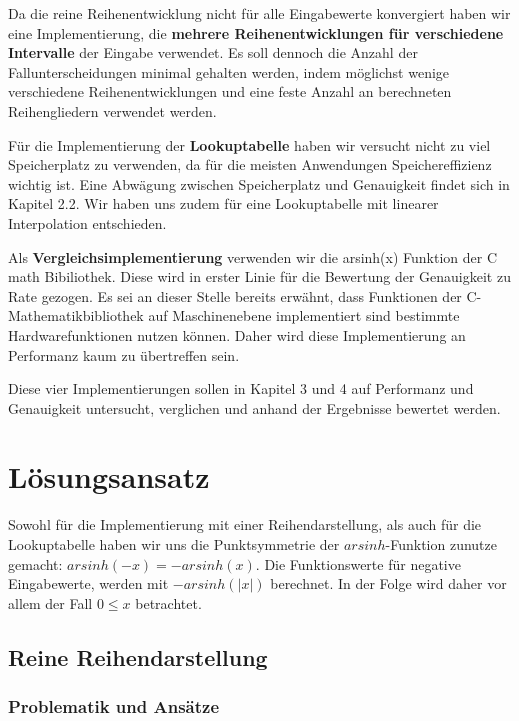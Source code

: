 \documentclass[course=erap] {aspdoc}
\begin{document}
     Da die reine Reihenentwicklung nicht für alle Eingabewerte konvergiert haben wir eine Implementierung, die \textbf{mehrere Reihenentwicklungen für verschiedene Intervalle} der Eingabe verwendet. Es soll dennoch die Anzahl der Fallunterscheidungen minimal gehalten werden, indem  möglichst wenige verschiedene Reihenentwicklungen und eine feste Anzahl an berechneten Reihengliedern verwendet werden.
 
     Für die Implementierung der \textbf{Lookuptabelle} haben wir versucht nicht zu viel Speicherplatz zu verwenden, da für die meisten Anwendungen Speichereffizienz wichtig ist. Eine Abwägung zwischen Speicherplatz und Genauigkeit findet sich in Kapitel 2.2. Wir haben uns zudem für eine Lookuptabelle mit linearer Interpolation entschieden.
 
     Als \textbf{Vergleichsimplementierung} verwenden wir die arsinh(x) Funktion der C math Bibiliothek. Diese wird in erster Linie für die Bewertung der Genauigkeit zu Rate gezogen. Es sei an dieser Stelle bereits erwähnt, dass Funktionen der C-Mathematikbibliothek auf Maschinenebene implementiert sind bestimmte Hardwarefunktionen nutzen können. Daher wird diese Implementierung an Performanz kaum zu übertreffen sein.
 
     Diese vier Implementierungen sollen in Kapitel 3 und 4 auf Performanz und Genauigkeit untersucht, verglichen und anhand der Ergebnisse bewertet werden.
     
 
 
     \section{Lösungsansatz}
 
     Sowohl für die Implementierung mit einer Reihendarstellung, als auch für die Lookuptabelle haben wir uns die Punktsymmetrie der $arsinh$-Funktion zunutze gemacht: $arsinh(-x) = -arsinh(x)$. Die Funktionswerte für negative Eingabewerte, werden mit $-arsinh(|x|)$ berechnet. In der Folge wird daher vor allem der Fall $0\leq x$ betrachtet.

     \subsection{Reine Reihendarstellung}
     \subsubsection{Problematik und Ansätze}
\end{document}
